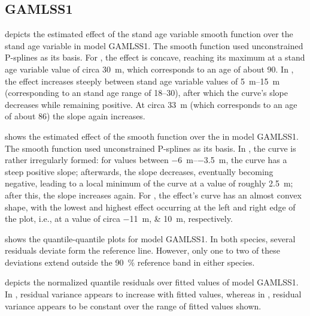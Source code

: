 \subsection{GAMLSS1}

 depicts the estimated effect of the stand age variable smooth function over the stand age variable in model GAMLSS1.  The smooth function used unconstrained P-splines as its basis.  For \Beech{}, the effect is concave, reaching its maximum at a stand age variable value of circa \SI{30}{\meter}, which corresponds to an age of about \SI{90}{\year}.  In \Spruce{}, the effect increases steeply between stand age variable values of \SIrange{5}{15}{\meter} (corresponding to an stand age range of \SIrange{18}{30}{\year}), after which the curve’s slope decreases while remaining positive.  At circa \SI{33}{\meter} (which corresponds to an age of about \SI{86}{\year}) the slope again increases.

 shows the estimated effect of the \ProductivityIndexVariableText{} smooth function over the \ProductivityIndexVariableText{} in model GAMLSS1.  The smooth function used unconstrained P-splines as its basis.  In \Beech{}, the curve is rather irregularly formed:  for \ProductivityIndexVariableText{} values between \SIrange{-6}{-3.5}{\meter}, the curve has a steep positive slope;  afterwards, the slope decreases, eventually becoming negative, leading to a local minimum of the curve at a \ProductivityIndexVariableText{} value of roughly \SI{2.5}{\meter}; after this, the slope increases again.  For \Spruce{}, the effect’s curve has an almost convex shape, with the lowest and highest effect occurring at the left and right edge of the plot, i.e., at a \ProductivityIndexVariableText{} value of circa \SIlist{-11;10}{\meter}, respectively.

 shows the quantile-quantile plots for model GAMLSS1.  In both species, several residuals deviate form the reference line.  However, only one to two of these deviations extend outside the \SI{90}{\percent} reference band in either species.

 depicts the normalized quantile residuals over fitted values of model GAMLSS1.  In \Beech{}, residual variance appears to increase with fitted values, whereas in \Spruce{}, residual variance appears to be constant over the range of fitted values shown.

